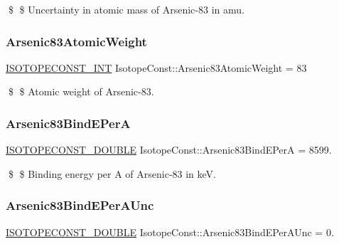 \$ \$ Uncertainty in atomic mass of Arsenic-\/83 in amu. \mbox{\label{group___isotope_const-_arsenic-_as83_gaa4cd369c4c3a9936a9be892ccb8e7aa9}} 
\subsubsection{\texorpdfstring{Arsenic83\+Atomic\+Weight}{Arsenic83AtomicWeight}}
{\footnotesize\ttfamily \mbox{\hyperlink{group___isotope_const-_macros_ga5f18360b3e99483a35c32d789e62621c}{I\+S\+O\+T\+O\+P\+E\+C\+O\+N\+S\+T\+\_\+\+I\+NT}} Isotope\+Const\+::\+Arsenic83\+Atomic\+Weight = 83}

\$ \$ Atomic weight of Arsenic-\/83. \mbox{\label{group___isotope_const-_arsenic-_as83_gaf356b8551573f8987c8a63c131833aee}} 
\subsubsection{\texorpdfstring{Arsenic83\+Bind\+E\+PerA}{Arsenic83BindEPerA}}
{\footnotesize\ttfamily \mbox{\hyperlink{group___isotope_const-_macros_ga8f45a7272ce02c0b4c65c44636ed719a}{I\+S\+O\+T\+O\+P\+E\+C\+O\+N\+S\+T\+\_\+\+D\+O\+U\+B\+LE}} Isotope\+Const\+::\+Arsenic83\+Bind\+E\+PerA = 8599.}

\$ \$ Binding energy per A of Arsenic-\/83 in keV. \mbox{\label{group___isotope_const-_arsenic-_as83_ga0e7ec09aa51fd7eb58c13e7ea170cc39}} 
\subsubsection{\texorpdfstring{Arsenic83\+Bind\+E\+Per\+A\+Unc}{Arsenic83BindEPerAUnc}}
{\footnotesize\ttfamily \mbox{\hyperlink{group___isotope_const-_macros_ga8f45a7272ce02c0b4c65c44636ed719a}{I\+S\+O\+T\+O\+P\+E\+C\+O\+N\+S\+T\+\_\+\+D\+O\+U\+B\+LE}} Isotope\+Const\+::\+Arsenic83\+Bind\+E\+Per\+A\+Unc = 0.}

